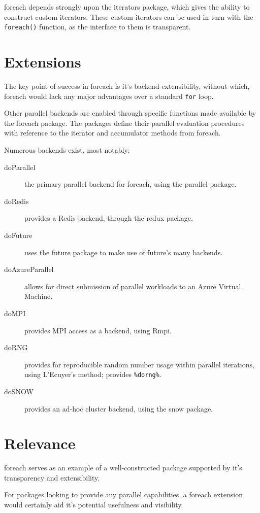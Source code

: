 \documentclass[a4paper,10pt]{article}
\begin{document}
foreach depends strongly upon the iterators package, which gives the
ability to construct custom iterators. These custom iterators can be
used in turn with the \texttt{foreach()} function, as the interface to
them is transparent.

\section{Extensions}
\label{sec:extensions}

The key point of success in foreach is it's backend extensibility,
without which, foreach would lack any major advantages over a standard
\texttt{for} loop.

Other parallel backends are enabled through specific functions made
available by the foreach package. The packages define their parallel
evaluation procedures with reference to the iterator and accumulator
methods from foreach.

Numerous backends exist, most notably:
\begin{description}
\item[doParallel] the primary parallel backend for foreach, using the
  parallel package\cite{corporation19}.
\item[doRedis]  provides a Redis backend, through the redux package\cite{lewis20}.
\item[doFuture] uses the future package to make use of future's many
  backends\cite{bengtsson20do}.
\item[doAzureParallel] allows for direct submission of parallel
  workloads to an Azure Virtual Machine\cite{hoang20}.
\item[doMPI] provides MPI access as a backend, using Rmpi\cite{weston17}.
\item[doRNG] provides for reproducible random number usage within
  parallel iterations, using L'Ecuyer's method; provides
  \texttt{\%dorng\%}\cite{gaujoux20}.
\item[doSNOW] provides an ad-hoc cluster backend, using the snow
  package\cite{dosnow19}.
\end{description}

\section{Relevance}
\label{sec:relevance}

foreach serves as an example of a well-constructed package supported
by it's transparency and extensibility.

For packages looking to provide any parallel capabilities, a foreach
extension would certainly aid it's potential usefulness and
visibility.

\printbibliography{}
\end{document}
